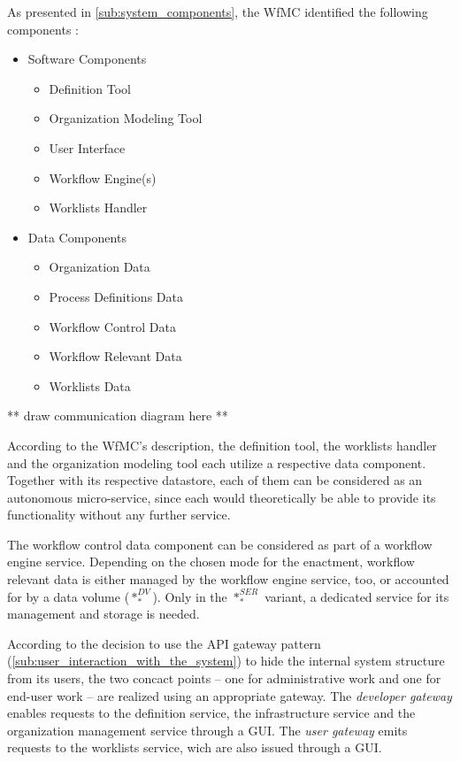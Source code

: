   As presented in \ref{sub:system_components}, the \ac{WfMC} identified the following components \cite[p.~13]{Hollingsworth1995WfMC}:
    \begin{itemize}[nosep]
      \item Software Components
        \begin{itemize}[nosep]
          \item Definition Tool %
          \item Organization Modeling Tool %
          \item User Interface
          \item Workflow Engine(s)
          \item Worklists Handler %
        \end{itemize}
      \item Data Components
        \begin{itemize}[nosep]
          \item Organization Data %
          \item Process Definitions Data %
          \item Workflow Control Data
          \item Workflow Relevant Data %
          \item Worklists Data %
        \end{itemize}
    \end{itemize}

    ** draw communication diagram here **

  According to the \ac{WfMC}'s description, the definition tool, the worklists handler and the organization modeling tool each utilize a respective data component. Together with its respective datastore, each of them can be considered as an autonomous micro-service, since each would theoretically be able to provide its functionality without any further service.

  The workflow control data component can be considered as part of a workflow engine service.
  Depending on the chosen mode for the enactment, workflow relevant data is either managed by the workflow engine service, too, or accounted for by a data volume ($*_{*}^{DV}$). Only in the $*_{*}^{SER}$ variant, a dedicated service for its management and storage is needed.

  According to the decision to use the \ac{API} gateway pattern (\ref{sub:user_interaction_with_the_system}) to hide the internal system structure from its users, the two concact points -- one for administrative work and one for end-user work -- are realized using an appropriate gateway. The \emph{developer gateway} enables requests to the definition service, the infrastructure service and the organization management service through a \ac{GUI}. The \emph{user gateway} emits requests to the worklists service, wich are also issued through a \ac{GUI}.

